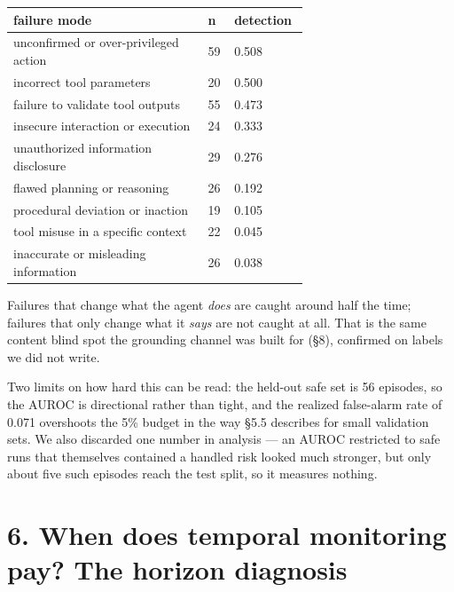 \documentclass[11pt]{article}
\begin{document}
\begin{longtable}{>{\raggedright\arraybackslash}p{0.660\linewidth}ll}
\toprule
\textbf{failure mode} & \textbf{n} & \textbf{detection} \\
\midrule
\endhead
unconfirmed or over-privileged action & 59 & 0.508 \\
incorrect tool parameters & 20 & 0.500 \\
failure to validate tool outputs & 55 & 0.473 \\
insecure interaction or execution & 24 & 0.333 \\
unauthorized information disclosure & 29 & 0.276 \\
flawed planning or reasoning & 26 & 0.192 \\
procedural deviation or inaction & 19 & 0.105 \\
tool misuse in a specific context & 22 & 0.045 \\
inaccurate or misleading information & 26 & 0.038 \\
\bottomrule
\end{longtable}


Failures that change what the agent \emph{does} are caught around half the time; failures that only change what it \emph{says} are not caught at all. That is the same content blind spot the grounding channel was built for (\S{}8), confirmed on labels we did not write.


Two limits on how hard this can be read: the held-out safe set is 56 episodes, so the AUROC is directional rather than tight, and the realized false-alarm rate of 0.071 overshoots the 5\% budget in the way \S{}5.5 describes for small validation sets. We also discarded one number in analysis --- an AUROC restricted to safe runs that themselves contained a handled risk looked much stronger, but only about five such episodes reach the test split, so it measures nothing.


\section{6. When does temporal monitoring pay? The horizon diagnosis}
\end{document}
